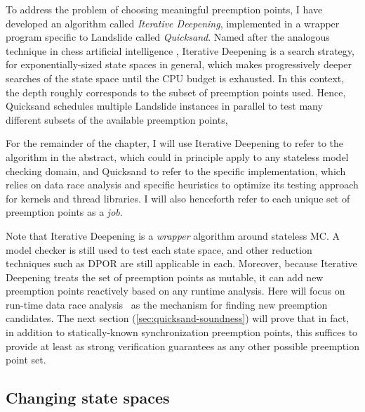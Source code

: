 To address the problem of choosing meaningful preemption points,
I have developed an algorithm called {\em Iterative Deepening},
implemented in a wrapper program specific to Landslide called {\em Quicksand}.
Named after the analogous technique in chess artificial intelligence \cite{iterative-deepening-chess-ai},
Iterative Deepening
is a search strategy,
for exponentially-sized state spaces in general,
which
makes progressively deeper searches of the state space until the CPU budget is exhausted.
In this context, the depth roughly corresponds to the subset of preemption points used.
Hence, Quicksand
schedules multiple Landslide instances in parallel to
test many different subsets of the available preemption points,

For the remainder of the chapter, I will use Iterative Deepening to refer to the algorithm in the abstract,
which could in principle apply to any stateless model checking domain,
and Quicksand to refer to the specific implementation,
which relies on data race analysis and specific heuristics to optimize its testing approach
for kernels and thread libraries.
I will also henceforth refer to each unique set of preemption points as a {\em job}.



Note that Iterative Deepening is a {\em wrapper} algorithm around stateless MC.
A model checker is still used to test each state space, and other reduction techniques such as DPOR
are still applicable in each.
Moreover, because Iterative Deepening treats the set of preemption points as mutable,
it can add new preemption points reactively based on any runtime analysis.
Here
will focus on run-time data race analysis~\cite{tsan,fasttrack} as the mechanism for finding new preemption candidates.
The next section (\cref{sec:quicksand-soundness})
will prove that in fact,
in addition to statically-known synchronization preemption points,
this suffices to provide at least as strong verification guarantees as any other possible preemption point set.


\subsection{Changing state spaces}

